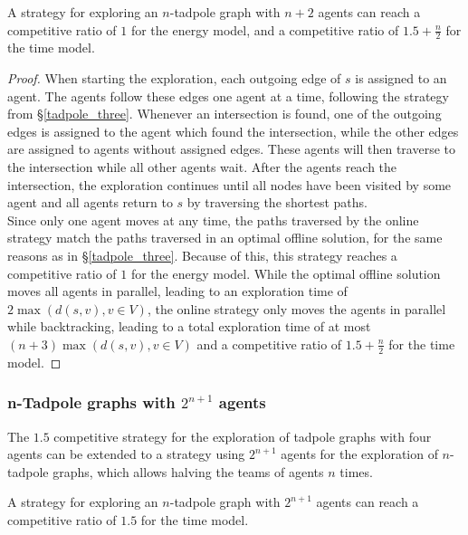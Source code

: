 \begin{theorem}\label{nTadpoleUpperNplusTwo}
    A strategy for exploring an $n$-tadpole graph with $n+2$ agents can reach a competitive ratio of $1$ for the energy model, and
    a competitive ratio of $1.5+\frac{n}{2}$ for the time model.
\end{theorem}


\begin{proof}
    When starting the exploration, each outgoing edge of $s$ is assigned to an agent. The agents follow these edges one agent at a time, following the strategy from \S\ref{tadpole_three}.
    Whenever an intersection is found, one of the outgoing edges is assigned to the agent which found the intersection, while the other edges
    are assigned to agents without assigned edges. These agents will then traverse to the intersection while all other agents wait. After the agents reach
    the intersection, the exploration continues until all nodes have been visited by some agent and all agents return to $s$ by traversing the shortest paths.\\
    Since only one agent moves at any time, the paths traversed by the online strategy match the paths traversed in an optimal offline solution, for the same reasons
    as in \S\ref{tadpole_three}. Because of this, this strategy reaches a competitive ratio of $1$ for the energy model. While the optimal offline solution moves all agents in parallel, leading to an exploration time of $2\max(d(s,v), v\in V)$, the online strategy only
    moves the agents in parallel while backtracking, leading to a total exploration time of at most $(n+3)\max(d(s,v), v\in V)$ and a competitive ratio of $1.5+\frac{n}{2}$ 
    for the time model.
\end{proof}
\subsubsection{n-Tadpole graphs with $2^{n+1}$ agents}\label{ntad_four}

The $1.5$ competitive strategy for the exploration of tadpole graphs with four agents can be extended to a strategy using $2^{n+1}$ agents for the exploration
of $n$-tadpole graphs, which allows halving the teams of agents $n$ times.

    \begin{theorem}\label{nTadpoleUpperExp}
        A strategy for exploring an $n$-tadpole graph with $2^{n+1}$ agents can reach a competitive ratio of $1.5$ for the time model.
    \end{theorem}

